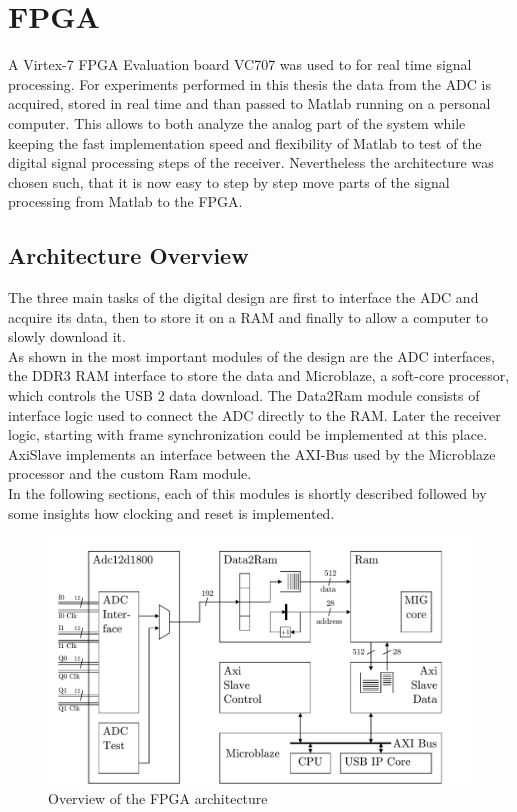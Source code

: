 \chapter{FPGA}
\label{chap:fpga}
A Virtex-7 \gls{FPGA} Evaluation board VC707
was used to for real time signal processing.
For experiments performed in this thesis
the data from the \gls{ADC} is acquired, stored in real time
and than passed to Matlab running on a personal computer.
This allows to both analyze the analog part of the system
while keeping the fast implementation speed and flexibility of Matlab
to test of the digital signal processing steps of the receiver.
Nevertheless the architecture was chosen such, that it is now easy
to step by step move parts of the signal processing from Matlab to the
\gls{FPGA}. \\

\section{Architecture Overview}
The three main tasks of the digital design are first to interface
the \gls{ADC} and acquire its data, then to store it on a
\gls{RAM} and finally to allow a computer to
slowly download it. \\

As shown in  the most important
modules of the design are the \gls{ADC} interfaces,
the \gls{DDR}3 \gls{RAM} interface to store the data
and Microblaze, a soft-core processor, which controls the
\gls{USB} 2 data download. The Data2Ram module consists of interface logic used
to connect the \gls{ADC} directly to the \gls{RAM}. Later the receiver logic,
starting with frame synchronization could be implemented
at this place. AxiSlave implements an interface between the
\gls{AXI}-Bus used by the Microblaze processor and the custom
Ram module. \\

In the following sections, each of this modules is shortly described followed
by some insights how clocking and reset is implemented. \\

\begin{figure}[ht]
  \centering
  \includegraphics[width=\textwidth]{figures/fpga_architecture_overview}
  \caption{Overview of the \gls{FPGA} architecture}
  \label{fig:fpga_architecture_overview}
\end{figure}

